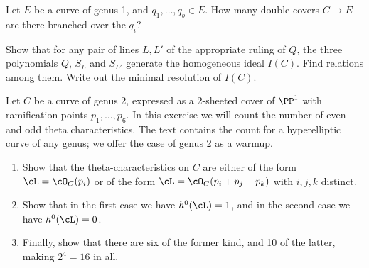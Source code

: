 \begin{exercise} Let $E$ be a curve of genus 1, and $q_1,\dots,q_b \in E$. How many double covers $C \to E$ are there branched over the $q_i$?

\end{exercise}



\begin{exercise}\label{ideal of genus 2 degree 5} 
Show that for any pair of lines $L, L'$ of the appropriate ruling of $Q$, the three polynomials $Q$, $S_L$ and $S_{L'}$ generate the homogeneous ideal $I(C)$. Find relations among them. Write out the minimal resolution of $I(C)$.
\end{exercise}


\begin{exercise}\label{theta char on genus 2} %
 Let $C$ be a curve of genus 2, expressed as a 2-sheeted cover of $\PP^1$ with ramification points $p_1,\dots,p_6$. In this exercise we will
 count the number of
 even and odd theta characteristics.
The text contains the count for a hyperelliptic curve of any genus; we offer 
the case of genus 2 as a warmup.
 \begin{enumerate}
 \item Show that the theta-characteristics on $C$ are either of the form $\cL = \cO_C(p_i)$ or of the form $\cL = \cO_C(p_i + p_j - p_k)$ with $i, j, k$ distinct. 
 \item Show that in the first case we have $h^0(\cL) = 1$, and in the second case we have $h^0(\cL) = 0$. 
 \item Finally, show that there are six of the former kind, and 10 of the latter, making $2^4 = 16$ in all.
 \end{enumerate} 
 \end{exercise}
 
